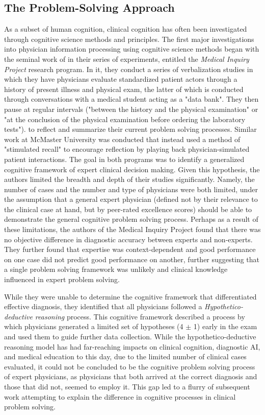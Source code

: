 \subsection{The Problem-Solving Approach}

As a subset of human cognition, clinical cognition has often been investigated through cognitive science methods and principles. The first major investigations into physician information processing using cognitive science methods began with the seminal work of \citet{elstein1978medical} in their series of experiments, entitled the \emph{Medical Inquiry Project} research program. In it, they conduct a series of verbalization studies in which they have physicians evaluate standardized patient actors through a history of present illness and physical exam, the latter of which is conducted through conversations with a medical student acting as a "data bank". They then pause at regular intervals ("between the history and the physical examination" or "at the conclusion of the physical examination before ordering the laboratory tests")\citep{organizationStudyMedicalDiagnostic1970}.  to reflect and summarize their current problem solving processes. Similar work at McMaster University was conducted that instead used a method of "stimulated recall" to encourage reflection by playing back physician-simulated patient interactions. The goal in both programs was to identify a generalized cognitive framework of expert clinical decision making. Given this hypothesis, the authors limited the breadth and depth of their studies significantly. Namely, the number of cases and the number and type of physicians were both limited, under the assumption that a general expert physician (defined not by their relevance to the clinical case at hand, but by peer-rated excellence scores) should be able to demonstrate the general cognitive problem solving process. Perhaps as a result of these limitations, the authors of the Medical Inquiry Project found that there was no objective difference in diagnostic accuracy between experts and non-experts. They further found that expertise was context-dependent and good performance on one case did not predict good performance on another, further suggesting that a single problem solving framework was unlikely and clinical knowledge influenced in expert problem solving. 

While they were unable to determine the cognitive framework that differentiated effective diagnosis, they identified that all physicians followed a \emph{Hypothetico-deductive reasoning} process. This cognitive framework described a process by which physicians generated a limited set of hypotheses (4 $\pm$ 1) early in the exam and used them to guide further data collection. While the hypothetico-deductive reasoning model has had far-reaching impacts on clinical cognition, diagnostic AI, and medical education to this day, due to the limited number of clinical cases evaluated, it could not be concluded to be the cognitive problem solving process of expert physicians, as physicians that both arrived at the correct diagnosis and those that did not, seemed to employ it. This gap led to a flurry of subsequent work attempting to explain the difference in cognitive processes in clinical problem solving. 

